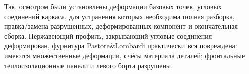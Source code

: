 \begin{spacing}{1.2}
\end{spacing}

Так, осмотром были установлены деформации базовых точек,  угловых соединений каркаса, для устранения которых необходима полная разборка, правка/замена разрушенных, деформированных компонент и окончательная сборка. Нержавеющий профиль, закрывающий угловые соединения деформирован, фурнитура Pastore\&Lombardi практически вся повреждена: имеются множественные  деформации, счёсы материала деталей; фронтальные теплоизоляционные панели и левого борта разрушены.
%
%
%
%
%
